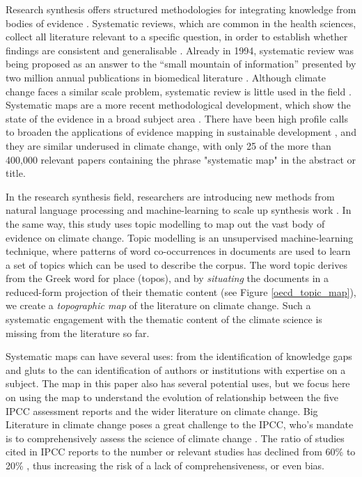 \documentclass{article}
\begin{document}
\begin{linenumbers}
Research synthesis offers structured methodologies for integrating knowledge from bodies of evidence \cite{Chalmers2002}. Systematic reviews, which are common in the health sciences, collect all literature relevant to a specific question, in order to establish whether findings are consistent and generalisable \cite{Mulrow597}. Already in 1994, systematic review was being proposed as an answer to the ``small mountain of information'' presented by two million annual publications in biomedical literature \cite{Mulrow597}. Although climate change faces a similar scale problem, systematic review is little used in the field \cite{Berrang-Ford2015}. Systematic maps are a more recent methodological development, which show the state of the evidence in a broad subject area \cite{James2016}. There have been high profile calls to broaden the applications of evidence mapping in sustainable development \cite{McKinnon2015}, and they are similar underused in climate change, with only 25 of the more than 400,000 relevant papers containing the phrase "systematic map" in the abstract or title. 


In the research synthesis field, researchers are introducing new methods from natural language processing and machine-learning to scale up synthesis work \cite{OMara-Eves2015, Westgate2018a}. In the same way, this study uses topic modelling \cite{Blei2010} to map out the vast body of evidence on climate change. Topic modelling is an unsupervised machine-learning technique, where patterns of word co-occurrences in documents are used to learn a set of topics which can be used to describe the corpus. The word topic derives from the Greek word for place (topos), and by \textit{situating} the documents in a reduced-form projection of their thematic content (see Figure \ref{oecd_topic_map}), we create a \textit{topographic map} of the literature on climate change. Such a systematic engagement with the thematic content of the climate science is missing from the literature so far.%

Systematic maps can have several uses: from the identification of knowledge gaps and gluts to the can identification of authors or institutions with expertise on a subject. The map in this paper also has several potential uses, but we focus here on using the map to understand the evolution of relationship between the five IPCC assessment reports and the wider literature on climate change. Big Literature in climate change poses a great challenge to the IPCC, who's mandate is to comprehensively assess the science of climate change \cite{IPCC2013}. The ratio of studies cited in IPCC reports to the number or relevant studies has declined from 60\% to 20\%  \cite{Minx2017l}, thus increasing the risk of a lack of comprehensiveness, or even bias.  


\end{linenumbers}
\end{document}
